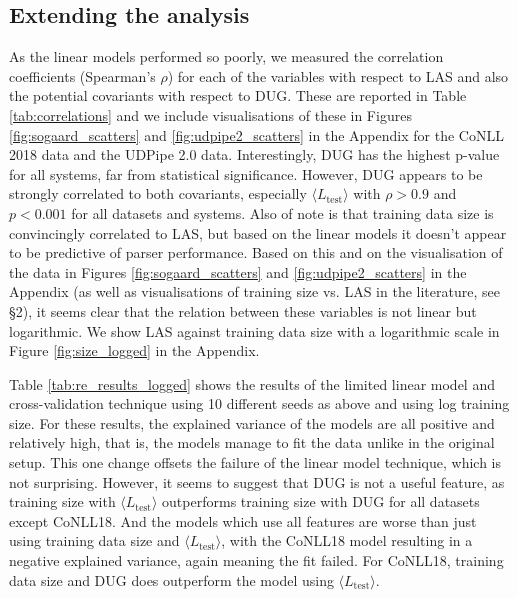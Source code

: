 \documentclass[11pt,a4paper]{article}
\newcommand{\MTL}{{$\langle L_{\textrm{test}}\rangle$}}
\begin{document}
\subsection{Extending the analysis}
As the linear models performed so poorly, we measured the correlation coefficients (Spearman's $\rho$) for each of the variables with respect to LAS and also the potential covariants with respect to DUG. These are reported in Table \ref{tab:correlations} and we include visualisations of these in Figures \ref{fig:sogaard_scatters} and \ref{fig:udpipe2_scatters} in the Appendix for the CoNLL 2018 data and the UDPipe 2.0 data.
Interestingly, DUG has the highest p-value for all systems, far from statistical significance. However, DUG appears to be strongly correlated to both covariants, especially {\MTL}
with $\rho > 0.9$ and $p < 0.001$ for all datasets and systems. Also of note is that training data size is convincingly correlated to LAS, but based on the linear models it doesn't appear to be predictive of parser performance. Based on this and on the visualisation of the data in Figures \ref{fig:sogaard_scatters} and \ref{fig:udpipe2_scatters} in the Appendix (as well as visualisations of training size vs. LAS in the literature, see \S 2), it seems clear that the relation between these variables is not linear but logarithmic. We show LAS against training data size with a logarithmic scale in Figure \ref{fig:size_logged} in the Appendix. 


Table \ref{tab:re_results_logged} shows the results of the limited linear model and cross-validation technique using 10 different seeds as above and using log training size. For these results, the explained variance of the models are all positive and relatively high, that is, the models manage to fit the data unlike in the original setup. This one change offsets the failure of the linear model technique, which is not surprising. However, it seems to suggest that DUG is not a useful feature, as training size with {\MTL} outperforms training size with DUG for all datasets except CoNLL18. And the models which use all features are worse than just using training data size and {\MTL}, with the CoNLL18 model resulting in a negative explained variance, again meaning the fit failed. For CoNLL18, training data size and DUG does outperform the model using \MTL. 
\end{document}
